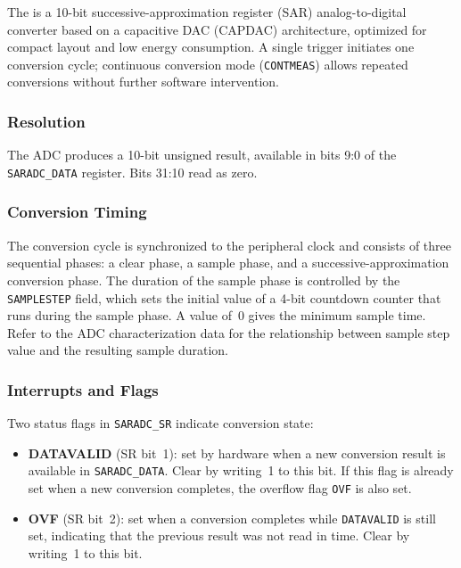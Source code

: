 The  is a 10-bit successive-approximation register (SAR) analog-to-digital converter based on a capacitive DAC (CAPDAC) architecture, optimized for compact layout and low energy consumption. A single trigger initiates one conversion cycle; continuous conversion mode (\texttt{CONTMEAS}) allows repeated conversions without further software intervention.

\subsubsection*{Resolution}

The ADC produces a 10-bit unsigned result, available in bits 9:0 of the \texttt{SARADC\_DATA} register. Bits 31:10 read as zero.

\subsubsection*{Conversion Timing}

The conversion cycle is synchronized to the peripheral clock and consists of three sequential phases: a clear phase, a sample phase, and a successive-approximation conversion phase. The duration of the sample phase is controlled by the \texttt{SAMPLESTEP} field, which sets the initial value of a 4-bit countdown counter that runs during the sample phase. A value of~0 gives the minimum sample time. Refer to the ADC characterization data for the relationship between sample step value and the resulting sample duration.

\subsubsection*{Interrupts and Flags}

Two status flags in \texttt{SARADC\_SR} indicate conversion state:

\begin{itemize}
    \item \textbf{DATAVALID} (SR bit~1): set by hardware when a new conversion result is available in \texttt{SARADC\_DATA}. Clear by writing~1 to this bit. If this flag is already set when a new conversion completes, the overflow flag \texttt{OVF} is also set.
    \item \textbf{OVF} (SR bit~2): set when a conversion completes while \texttt{DATAVALID} is still set, indicating that the previous result was not read in time. Clear by writing~1 to this bit.
\end{itemize}


